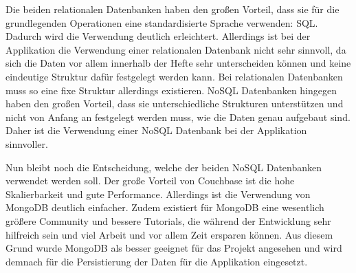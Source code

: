 Die beiden relationalen Datenbanken haben den großen Vorteil, dass sie für die grundlegenden Operationen eine standardisierte Sprache verwenden: SQL. Dadurch wird die Verwendung deutlich erleichtert. Allerdings ist bei der Applikation die Verwendung einer relationalen Datenbank nicht sehr sinnvoll, da sich die Daten vor allem innerhalb der Hefte sehr unterscheiden können und keine eindeutige Struktur dafür festgelegt werden kann. Bei relationalen Datenbanken muss so eine fixe Struktur allerdings existieren. NoSQL Datenbanken hingegen haben den großen Vorteil, dass sie unterschiedliche Strukturen unterstützen und nicht von Anfang an festgelegt werden muss, wie die Daten genau aufgebaut sind. Daher ist die Verwendung einer NoSQL Datenbank bei der Applikation sinnvoller.

Nun bleibt noch die Entscheidung, welche der beiden NoSQL Datenbanken verwendet werden soll. Der große Vorteil von Couchbase ist die hohe Skalierbarkeit und gute Performance. Allerdings ist die Verwendung von MongoDB deutlich einfacher. Zudem existiert für MongoDB eine wesentlich größere Community und bessere Tutorials, die während der Entwicklung sehr hilfreich sein und viel Arbeit und vor allem Zeit ersparen können. Aus diesem Grund wurde MongoDB als besser geeignet für das Projekt angesehen und wird demnach für die Persistierung der Daten für die Applikation eingesetzt.